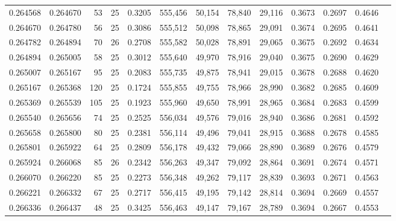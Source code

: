 \begin{tabular}{rrrrrrrrrrrrr}
0.264568 & 0.264670 &    53 &  25 &                                     0.3205 & 555,456 &  50,154 &  78,840 &  29,116 & 0.3673 & 0.2697 & 0.4646 \\
0.264670 & 0.264780 &    56 &  25 &                                     0.3086 & 555,512 &  50,098 &  78,865 &  29,091 & 0.3674 & 0.2695 & 0.4641 \\
0.264782 & 0.264894 &    70 &  26 &                                     0.2708 & 555,582 &  50,028 &  78,891 &  29,065 & 0.3675 & 0.2692 & 0.4634 \\
0.264894 & 0.265005 &    58 &  25 &                                     0.3012 & 555,640 &  49,970 &  78,916 &  29,040 & 0.3675 & 0.2690 & 0.4629 \\
0.265007 & 0.265167 &    95 &  25 &                                     0.2083 & 555,735 &  49,875 &  78,941 &  29,015 & 0.3678 & 0.2688 & 0.4620 \\
0.265167 & 0.265368 &   120 &  25 &                                     0.1724 & 555,855 &  49,755 &  78,966 &  28,990 & 0.3682 & 0.2685 & 0.4609 \\
0.265369 & 0.265539 &   105 &  25 &                                     0.1923 & 555,960 &  49,650 &  78,991 &  28,965 & 0.3684 & 0.2683 & 0.4599 \\
0.265540 & 0.265656 &    74 &  25 &                                     0.2525 & 556,034 &  49,576 &  79,016 &  28,940 & 0.3686 & 0.2681 & 0.4592 \\
0.265658 & 0.265800 &    80 &  25 &                                     0.2381 & 556,114 &  49,496 &  79,041 &  28,915 & 0.3688 & 0.2678 & 0.4585 \\
0.265801 & 0.265922 &    64 &  25 &                                     0.2809 & 556,178 &  49,432 &  79,066 &  28,890 & 0.3689 & 0.2676 & 0.4579 \\
0.265924 & 0.266068 &    85 &  26 &                                     0.2342 & 556,263 &  49,347 &  79,092 &  28,864 & 0.3691 & 0.2674 & 0.4571 \\
0.266070 & 0.266220 &    85 &  25 &                                     0.2273 & 556,348 &  49,262 &  79,117 &  28,839 & 0.3693 & 0.2671 & 0.4563 \\
0.266221 & 0.266332 &    67 &  25 &                                     0.2717 & 556,415 &  49,195 &  79,142 &  28,814 & 0.3694 & 0.2669 & 0.4557 \\
0.266336 & 0.266437 &    48 &  25 &                                     0.3425 & 556,463 &  49,147 &  79,167 &  28,789 & 0.3694 & 0.2667 & 0.4553 \\

\end{tabular}
